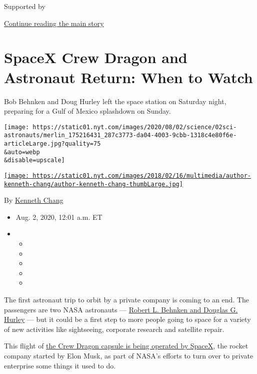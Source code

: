 Supported by

\protect\hyperlink{after-sponsor}{Continue reading the main story}

\hypertarget{spacex-crew-dragon-and-astronaut-return-when-to-watch}{%
\section{SpaceX Crew Dragon and Astronaut Return: When to
Watch}\label{spacex-crew-dragon-and-astronaut-return-when-to-watch}}

Bob Behnken and Doug Hurley left the space station on Saturday night,
preparing for a Gulf of Mexico splashdown on Sunday.

\texttt{[image: https://static01.nyt.com/images/2020/08/02/science/02sci-astronauts/merlin\_175216431\_287c3773-da04-4003-9cbb-1318c4e80f6e-articleLarge.jpg?quality=75\\\&auto=webp\\\&disable=upscale]}

\href{https://www.nytimes.com/by/kenneth-chang}{\texttt{[image: https://static01.nyt.com/images/2018/02/16/multimedia/author-kenneth-chang/author-kenneth-chang-thumbLarge.jpg]}}

By \href{https://www.nytimes.com/by/kenneth-chang}{Kenneth Chang}

\begin{itemize}
\item
  Aug. 2, 2020, 12:01 a.m. ET
\item
  \begin{itemize}
  \item
  \item
  \item
  \item
  \item
  \end{itemize}
\end{itemize}

The first astronaut trip to orbit by a private company is coming to an
end. The passengers are two NASA astronauts ---
\href{https://www.nytimes.com/2020/05/27/science/bob-behnken-doug-hurley.html}{Robert
L. Behnken and Douglas G. Hurley} --- but it could be a first step to
more people going to space for a variety of new activities like
sightseeing, corporate research and satellite repair.

This flight of
\href{https://www.nytimes.com/interactive/2020/05/26/science/spacex-nasa.html}{the
Crew Dragon capsule is being operated by SpaceX}, the rocket company
started by Elon Musk, as part of NASA's efforts to turn over to private
enterprise some things it used to do.

